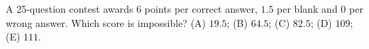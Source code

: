 A 25-question contest awards $6$ points per correct answer, $1.5$ per blank and $0$ per wrong answer. Which score is impossible? (A) $19.5$; (B) $64.5$; (C) $82.5$; (D) $109$; (E) $111$.
